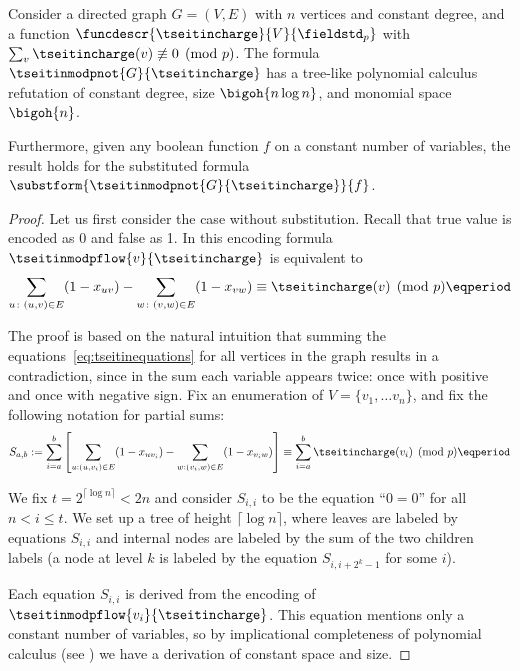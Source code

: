 \documentclass{toc}
\begin{document}
\begin{lemma}\label{lmm:tseitinupperbound}
  Consider a directed graph $G=(V,E)$ with $n$ vertices and constant
  degree, and a function
  \mbox{$\funcdescr{\tseitincharge}{V}{\fieldstd_p}$}
  with
  $\sum_{v}\tseitincharge(v)\not\equiv 0 \pmod{p}$. The formula
  $\tseitinmodpnot{G}{\tseitincharge}$ has a tree-like polynomial calculus
  refutation of constant degree, size $\bigoh{n\log n}$, and monomial
  space $\bigoh{n}$.

  Furthermore, given any boolean function $f$ on a constant number of
  variables, the result holds for the substituted formula
  $\substform{\tseitinmodpnot{G}{\tseitincharge}}{f}$.
\end{lemma}

\begin{proof}
Let us first consider the case without substitution. Recall that true value is encoded as $0$ and false as 1. In this encoding formula $\tseitinmodpflow{v}{\tseitincharge}$ is equivalent to
  \begin{equation}\label{eq:tseitinequations}
    \sum_{u\colon(u,v)\in E} (1-x_{uv}) - \sum_{w\colon(v,w)\in E} (1-x_{vw})
    \equiv \tseitincharge(v) \pmod{p} \eqperiod
  \end{equation}

  The proof is based on the natural intuition that summing the
  equations~\eqref{eq:tseitinequations} for all vertices in the graph
  results in a contradiction, since in the sum each variable appears
  twice: once with positive and once with negative sign.
  Fix an enumeration of $V=\{v_{1},\ldots
  v_{n}\}$, and fix the following notation for partial sums:
  \begin{equation}
    S_{a,b}:=
    \sum^{b}_{i=a}
    \left[\sum_{u:(u,v_{i})\in E} (1-x_{uv_{i}})
    -
    \sum_{w:(v_{i},w)\in E} (1-x_{v_{i}w})\right]
    \equiv
    \sum^{b}_{i=a} \tseitincharge(v_{i}) \pmod{p} \eqperiod
  \end{equation}
  
  
  We fix $t=2^{\lceil \log n \rceil} < 2n$ and consider $S_{i,i}$ to
  be the equation ``$0=0$'' for all $n < i \leq t$.
  We set up a tree of height $\lceil \log n \rceil$, where leaves are
  labeled by equations $S_{i,i}$ and internal nodes are labeled by the
  sum of the two children labels (\ieComma a node at level $k$ is labeled
  by the equation $S_{i,i+2^{k}-1}$ for some $i$).

  Each equation $S_{i,i}$ is derived from the encoding of
  $\tseitinmodpflow{v_{i}}{\tseitincharge}$. This equation mentions only a constant
  number of variables, so by implicational completeness of polynomial
  calculus (see ) we have a derivation
  of constant space and size.


\end{proof}
\end{document}

